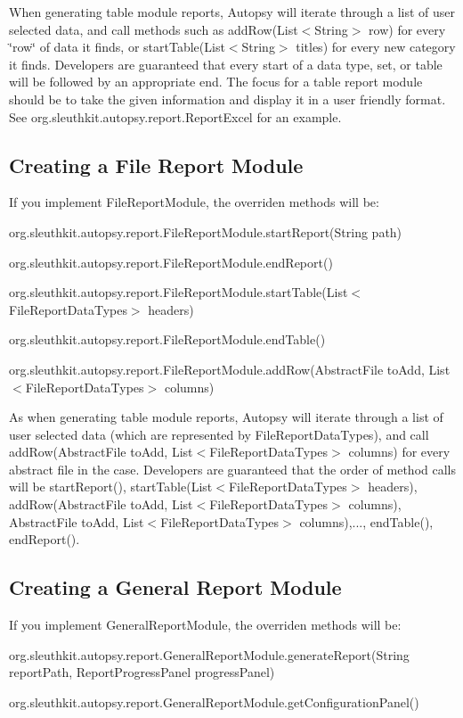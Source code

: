 When generating table module reports, Autopsy will iterate through a list of user selected data, and call methods such as add\+Row(\+List$<$\+String$>$ row) for every \char`\"{}row\char`\"{} of data it finds, or start\+Table(\+List$<$\+String$>$ titles) for every new category it finds. Developers are guaranteed that every start of a data type, set, or table will be followed by an appropriate end. The focus for a table report module should be to take the given information and display it in a user friendly format. See org.\+sleuthkit.\+autopsy.\+report.\+Report\+Excel for an example.\hypertarget{mod_report_page_report_create_module_file}{}\subsection{Creating a File Report Module}\label{mod_report_page_report_create_module_file}
If you implement File\+Report\+Module, the overriden methods will be\+:
\begin{DoxyItemize}
\item org.\+sleuthkit.\+autopsy.\+report.\+File\+Report\+Module.\+start\+Report(\+String path)
\item org.\+sleuthkit.\+autopsy.\+report.\+File\+Report\+Module.\+end\+Report()
\item org.\+sleuthkit.\+autopsy.\+report.\+File\+Report\+Module.\+start\+Table(\+List$<$\+File\+Report\+Data\+Types$>$ headers)
\item org.\+sleuthkit.\+autopsy.\+report.\+File\+Report\+Module.\+end\+Table()
\item org.\+sleuthkit.\+autopsy.\+report.\+File\+Report\+Module.\+add\+Row(\+Abstract\+File to\+Add, List$<$\+File\+Report\+Data\+Types$>$ columns)
\end{DoxyItemize}

As when generating table module reports, Autopsy will iterate through a list of user selected data (which are represented by File\+Report\+Data\+Types), and call add\+Row(\+Abstract\+File to\+Add, List$<$\+File\+Report\+Data\+Types$>$ columns) for every abstract file in the case. Developers are guaranteed that the order of method calls will be start\+Report(), start\+Table(\+List$<$\+File\+Report\+Data\+Types$>$ headers), add\+Row(\+Abstract\+File to\+Add, List$<$\+File\+Report\+Data\+Types$>$ columns), Abstract\+File to\+Add, List$<$\+File\+Report\+Data\+Types$>$ columns),..., end\+Table(), end\+Report().\hypertarget{mod_report_page_report_create_module_general}{}\subsection{Creating a General Report Module}\label{mod_report_page_report_create_module_general}
If you implement General\+Report\+Module, the overriden methods will be\+:
\begin{DoxyItemize}
\item org.\+sleuthkit.\+autopsy.\+report.\+General\+Report\+Module.\+generate\+Report(\+String report\+Path, Report\+Progress\+Panel progress\+Panel)
\item org.\+sleuthkit.\+autopsy.\+report.\+General\+Report\+Module.\+get\+Configuration\+Panel()
\end{DoxyItemize}


